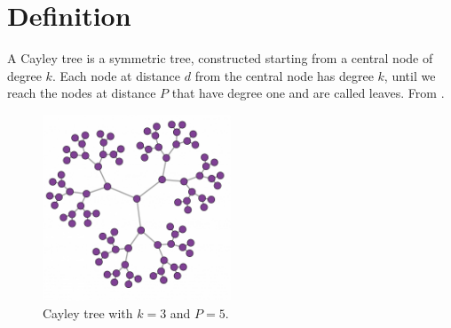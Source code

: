 \section{Definition}

    A Cayley tree is a symmetric tree, constructed starting from a central node of degree $k$. Each node at distance $d$ from the central node has degree $k$, until we reach the nodes at distance $P$ that have degree one and are called leaves. From \cite{barabasi}.

    \begin{figure}[H]
        \centering
        \includegraphics[width=0.5\textwidth]{images/caley-tree.jpg}

        \caption{Cayley tree with $k = 3$ and $P = 5$.}
    \end{figure}
